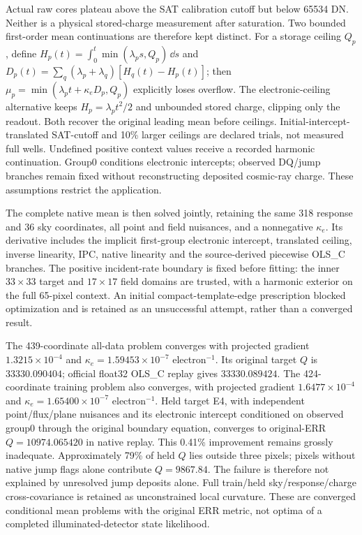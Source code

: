 Actual raw cores plateau above the SAT calibration cutoff but below
65534 DN. Neither is a physical stored-charge measurement after
saturation. Two bounded first-order mean continuations are therefore
kept distinct. For a storage ceiling $Q_p$, define
$H_p(t)=\int_0^t\min(\lambda_p s,Q_p)\,\dd s$ and
$D_p(t)=\sum_q(\lambda_p+\lambda_q)[H_q(t)-H_p(t)]$;
then $\mu_p=\min(\lambda_p t+\kappa_e D_p,Q_p)$ explicitly loses overflow.
The electronic-ceiling alternative keeps $H_p=\lambda_p t^2/2$ and
unbounded stored charge, clipping only the readout. Both recover the
original leading mean before ceilings. Initial-intercept-translated
SAT-cutoff and 10\% larger ceilings are declared trials, not measured
full wells. Undefined positive context values receive a recorded
harmonic continuation. Group0 conditions electronic intercepts;
observed DQ/jump branches remain fixed without reconstructing deposited
cosmic-ray charge. These assumptions restrict the application.

The complete native mean is then solved jointly, retaining the same
318 response and 36 sky coordinates, all point and field nuisances,
and a nonnegative $\kappa_e$. Its derivative includes the implicit
first-group electronic intercept, translated ceiling, inverse linearity,
IPC, native linearity and the source-derived piecewise OLS\_C branches.
The positive incident-rate boundary is fixed before fitting: the inner
$33\times33$ target and $17\times17$ field domains are trusted,
with a harmonic exterior on the full 65-pixel context. An initial
compact-template-edge prescription blocked optimization and is retained
as an unsuccessful attempt, rather than a converged result.

The 439-coordinate all-data problem converges with projected gradient
$1.3215\times10^{-4}$ and $\kappa_e=1.59453\times10^{-7}$ electron$^{-1}$.
Its original target $Q$ is $33330.090404$; official float32 OLS\_C
replay gives $33330.089424$. The 424-coordinate training problem
also converges, with projected gradient $1.6477\times10^{-4}$ and
$\kappa_e=1.65400\times10^{-7}$ electron$^{-1}$. Held target E4,
with independent point/flux/plane nuisances and its electronic intercept
conditioned on observed group0 through the original boundary equation, converges
to original-ERR $Q=10974.065420$ in native replay. This 0.41\%
improvement remains grossly inadequate. Approximately 79\% of held
$Q$ lies outside three pixels; pixels without native jump flags
alone contribute $Q=9867.84$. The failure is therefore not explained
by unresolved jump deposits alone. Full train/held sky/response/charge
cross-covariance is retained as unconstrained local curvature.
These are converged conditional mean problems with the original ERR
metric, not optima of a completed illuminated-detector state likelihood.

